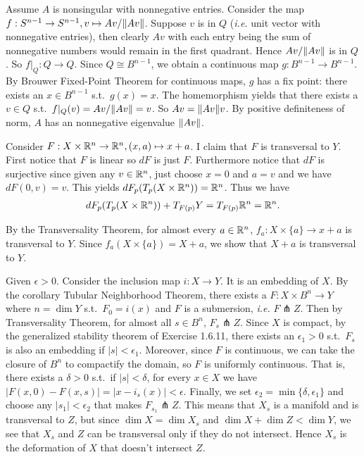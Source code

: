 \documentclass[12pt]{article}
\begin{document}
\begin{problem}[2.2.7]
Assume $ A$ is nonsingular with nonnegative entries. Consider the map $ f: S^{n-1} \to S^{n-1}, v \mapsto Av / {\left\lVert{ Av}\right\rVert} $. Suppose $ v$ is in $ Q$ (\emph{i.e.} unit vector with nonnegative entries), then clearly $ Av$ with each entry being the sum of nonnegative numbers would remain in the first quadrant. Hence  $ Av / {\left\lVert{ Av}\right\rVert} $ is in $ Q$. So $ f|_Q : Q \to Q$. Since $ Q \cong B^{n-1}$, we obtain a continuous map $ g: B^{n-1} \to B^{n-1}$. By Brouwer Fixed-Point Theorem for continuous maps, $ g$ has a fix point: there exists an $ x \in B^{n-1}$ s.t.\  $g(x) = x$. The homemorphism yields that there exists a $ v \in Q$ s.t.\ $ f|_Q(v) = Av / {\left\lVert{ Av}\right\rVert} = v$. So $ Av = {\left\lVert{ Av}\right\rVert} v $. By positive definiteness of norm, $ A$ has an nonnegative eigenvalue  $ {\left\lVert{ Av}\right\rVert} $.
\end{problem}

\begin{problem}[2.3.4]
Consider $ F:X \times \mathbb{R}^{n} \to \mathbb{R}^{n}, (x,a)\mapsto x+a$. I claim that $ F$ is transversal to  $ Y$. First notice that  $ F$ is linear so $ dF$ is just  $ F$. Furthermore notice that  $ dF$ is surjective since given any  $ v \in \mathbb{R}^{n}$, just choose $ x=0$ and  $ a=v$ and we have  $ dF(0,v) = v$. This yields $ dF_p(T_p (X \times \mathbb{R}^{n})) = \mathbb{R}^{n}$. Thus we have
\begin{align*}
	dF_p(T_p(X \times \mathbb{R}^{n})) + T_{F(p)}Y = T_{F(p)} \mathbb{R}^{n} =\mathbb{R}^{n}.
\end{align*}

By the Transversality Theorem, for almost every $ a \in \mathbb{R}^{n}$, $ f_a: X \times \{a\} \to x+a$ is transversal to $ Y$. Since  $ f_a(X \times \{a\} ) = X+a$, we show that $ X+a$ is transversal to  $ Y$.
\end{problem}

\begin{problem}[2.3.5]
Given $ \epsilon>0$. Consider the inclusion map $ i: X \to Y$. It is an embedding of $ X$. By the corollary Tubular Neighborhood Theorem, there exists a $ F: X \times B^{n} \to Y$ where $ n= \dim Y$  s.t.\ $ F_0 = i(x)$ and  $ F$ is a submersion,  \emph{i.e.} $ F \pitchfork Z$. Then by Transversality Theorem, for almost all $ s \in B^{n}$, $F_s \pitchfork Z$. Since $ X$ is compact, by the generalized stability theorem of Exercise 1.6.11, there exists an $ \epsilon_1>0$ s.t.\ $ F_s$ is also an embedding if $ |s|< \epsilon_1$. Moreover, since $ F$ is continuous, we can take the closure of $ B^{n}$ to compactify the domain, so $ F$ is uniformly continuous. That is, there exists a  $ \delta>0$ s.t.\ if $ |s|< \delta$, for every $ x \in X$ we have $|F(x,0)-F(x,s)| = |x-i_s(x)|< \epsilon$. Finally, we set $ \epsilon_2 = \min \{ \delta, \epsilon_1\}$ and choose any $ |s_1|< \epsilon_2$ that makes $ F_{s_1} \pitchfork Z$. This means that $ X_s$ is a manifold and is transversal to  $ Z$, but since  $ \dim X = \dim X_s$ and $ \dim X+ \dim  Z < \dim Y$, we see that $ X_s$ and  $ Z$ can be transversal only if they do not intersect. Hence  $ X_s$ is the deformation of  $ X$ that doesn't intersect  $ Z$.
\end{problem}
\end{document}
